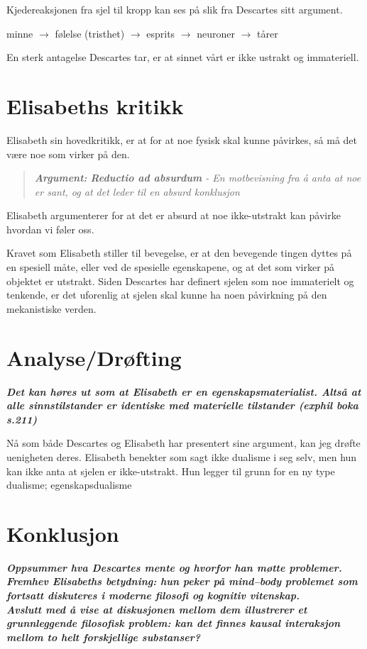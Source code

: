 \documentclass[12pt, a4paper]{article}
\newenvironment{argument}{\begin{quote}\itshape\textbf{Argument: }}{\end{quote}}
\begin{document}
Kjedereaksjonen fra sjel til kropp kan ses på slik fra Descartes sitt argument.

minne $\rightarrow$ følelse (tristhet) $\rightarrow$ esprits $\rightarrow$ neuroner $\rightarrow$ tårer


En sterk antagelse Descartes tar, er at sinnet vårt er ikke ustrakt og immateriell.

\section{Elisabeths kritikk}

Elisabeth sin hovedkritikk, er at for at noe fysisk skal kunne påvirkes, så må det være noe som virker på den. 
\begin{argument}
    \textbf{\textit{Reductio ad absurdum}} - En motbevisning fra å anta at noe er sant, og at det leder til en absurd konklusjon
\end{argument}

Elisabeth argumenterer for at det er absurd at noe ikke-utstrakt kan påvirke hvordan vi føler oss. 

Kravet som Elisabeth stiller til bevegelse, er at den bevegende tingen dyttes på en spesiell måte, eller ved de spesielle egenskapene, og at det som virker på objektet er utstrakt. Siden Descartes har definert sjelen som noe immaterielt og tenkende, er det uforenlig at sjelen skal kunne ha noen påvirkning på den mekanistiske verden. 

\section{Analyse/Drøfting}


\textbf{\textit{Det kan høres ut som at Elisabeth er en egenskapsmaterialist. Altså at alle sinnstilstander er identiske med materielle tilstander (exphil boka s.211)}}

Nå som både Descartes og Elisabeth har presentert sine argument, kan jeg drøfte uenigheten deres. Elisabeth benekter som sagt ikke dualisme i seg selv, men hun kan ikke anta at sjelen er ikke-utstrakt. Hun legger til grunn for en ny type dualisme;  egenskapsdualisme

\section{Konklusjon}

\textbf{\textit{Oppsummer hva Descartes mente og hvorfor han møtte problemer.\\
Fremhev Elisabeths betydning: hun peker på mind–body problemet som fortsatt diskuteres i moderne filosofi og kognitiv vitenskap.\\
Avslutt med å vise at diskusjonen mellom dem illustrerer et grunnleggende filosofisk problem: kan det finnes kausal interaksjon mellom to helt forskjellige substanser?}}
\end{document}
